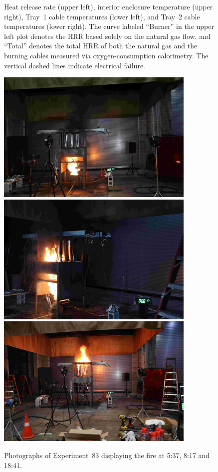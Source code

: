 \begin{figure}[H]
\caption[HRR and temperatures of Experiment 83]{Heat release rate (upper left), interior enclosure temperature (upper right), Tray~1 cable temperatures (lower left), and Tray~2 cable temperatures (lower right). The curve labeled ``Burner'' in the upper left plot denotes the HRR based solely on the natural gas flow, and ``Total'' denotes the total HRR of both the natural gas and the burning cables measured via oxygen-consumption calorimetry. The vertical dashed lines indicate electrical failure.}
\label{fig:Test_83}
\end{figure}

\begin{figure}[p]
\centering
\includegraphics[height=2.50in]{../FIGURES/Test_83_Photo_1} \\ \vspace{0.1in}
\includegraphics[height=2.50in]{../FIGURES/Test_83_Photo_2} \\ \vspace{0.1in}
\includegraphics[height=2.50in]{../FIGURES/Test_83_Photo_3}
\caption[Photographs of Experiment~83]{Photographs of Experiment~83 displaying the fire at 5:37, 8:17 and 18:41.}
\label{fig:Test_83_photos}
\end{figure}




